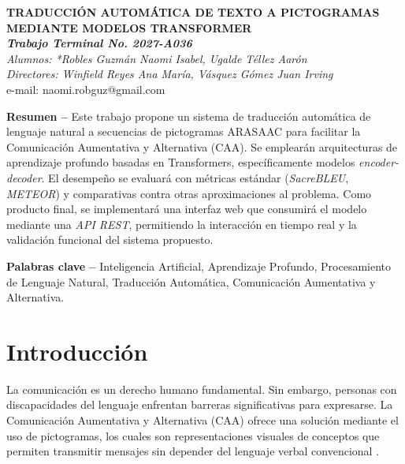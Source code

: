 \documentclass[10pt,letterpaper]{article}
\begin{document}
\begin{center}
    {\fontsize{14}{16}\selectfont \textbf{TRADUCCIÓN AUTOMÁTICA DE TEXTO A PICTOGRAMAS MEDIANTE MODELOS TRANSFORMER}} \\
    \vspace{0.2cm}
    {\fontsize{12}{14}\selectfont \textbf{\textit{Trabajo Terminal No. 2027-A036}}} \\
    \vspace{0.3cm}
    {\fontsize{12}{14}\selectfont \textit{Alumnos: *Robles Guzmán Naomi Isabel, Ugalde Téllez Aarón}} \\
    {\fontsize{12}{14}\selectfont \textit{Directores: Winfield Reyes Ana María, Vásquez Gómez Juan Irving}} \\
    \vspace{0.1cm}
    {\fontsize{10}{12}\selectfont *e-mail: naomi.robguz@gmail.com}
\end{center}

{\fontsize{10}{12}\selectfont

\textbf{Resumen --} Este trabajo propone un sistema de traducción automática de lenguaje natural a secuencias de pictogramas ARASAAC para facilitar la Comunicación Aumentativa y Alternativa (CAA). Se emplearán arquitecturas de aprendizaje profundo basadas en Transformers, específicamente modelos \textit{encoder-decoder}. El desempeño se evaluará con métricas estándar (\textit{SacreBLEU}, \textit{METEOR}) y comparativas contra otras aproximaciones al problema. Como producto final, se implementará una interfaz web que consumirá el modelo mediante una \textit{API REST}, permitiendo la interacción en tiempo real y la validación funcional del sistema propuesto.

}
\vspace{0.2cm}

{\fontsize{10}{12}\selectfont
\textbf{Palabras clave --} Inteligencia Artificial, Aprendizaje Profundo, Procesamiento de Lenguaje Natural, Traducción Automática, Comunicación Aumentativa y Alternativa.
}


\section{Introducción}

La comunicación es un derecho humano fundamental. Sin embargo, personas con discapacidades del lenguaje enfrentan barreras significativas para expresarse. La Comunicación Aumentativa y Alternativa (CAA) ofrece una solución mediante el uso de pictogramas, los cuales son representaciones visuales de conceptos que permiten transmitir mensajes sin depender del lenguaje verbal convencional \cite{beukelman2013}.
\end{document}
